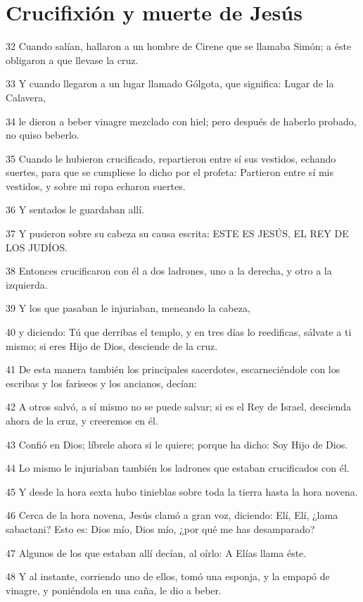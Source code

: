 \section*{Crucifixión y muerte de Jesús}

\par 32 Cuando salían, hallaron a un hombre de Cirene que se llamaba Simón; a éste obligaron a que llevase la cruz.
\par 33 Y cuando llegaron a un lugar llamado Gólgota, que significa: Lugar de la Calavera,
\par 34 le dieron a beber vinagre mezclado con hiel; pero después de haberlo probado, no quiso beberlo.
\par 35 Cuando le hubieron crucificado, repartieron entre sí sus vestidos, echando suertes, para que se cumpliese lo dicho por el profeta: Partieron entre sí mis vestidos, y sobre mi ropa echaron suertes.
\par 36 Y sentados le guardaban allí.
\par 37 Y pusieron sobre su cabeza su causa escrita: ESTE ES JESÚS, EL REY DE LOS JUDÍOS.
\par 38 Entonces crucificaron con él a dos ladrones, uno a la derecha, y otro a la izquierda.
\par 39 Y los que pasaban le injuriaban, meneando la cabeza,
\par 40 y diciendo: Tú que derribas el templo, y en tres días lo reedificas, sálvate a ti mismo; si eres Hijo de Dios, desciende de la cruz.
\par 41 De esta manera también los principales sacerdotes, escarneciéndole con los escribas y los fariseos y los ancianos, decían:
\par 42 A otros salvó, a sí mismo no se puede salvar; si es el Rey de Israel, descienda ahora de la cruz, y creeremos en él.
\par 43 Confió en Dios; líbrele ahora si le quiere; porque ha dicho: Soy Hijo de Dios.
\par 44 Lo mismo le injuriaban también los ladrones que estaban crucificados con él.
\par 45 Y desde la hora sexta hubo tinieblas sobre toda la tierra hasta la hora novena.
\par 46 Cerca de la hora novena, Jesús clamó a gran voz, diciendo: Elí, Elí, ¿lama sabactani? Esto es: Dios mío, Dios mío, ¿por qué me has desamparado?
\par 47 Algunos de los que estaban allí decían, al oírlo: A Elías llama éste.
\par 48 Y al instante, corriendo uno de ellos, tomó una esponja, y la empapó de vinagre, y poniéndola en una caña, le dio a beber.
